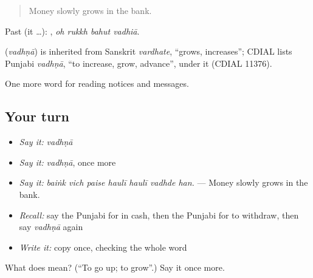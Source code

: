 \begin{quote}
Money slowly grows in the bank.
\end{quote}

Past (it …):    , \emph{oh rukkh bahut vadhiā}.

\begin{cousinweb}
\textbf{} (\emph{vadhṇā}) is inherited from Sanskrit \emph{vardhate}, \textquotedblleft{}grows, increases\textquotedblright{}; CDIAL lists Punjabi \emph{vadhṇā}, \textquotedblleft{}to increase, grow, advance\textquotedblright{}, under it (CDIAL 11376).
\end{cousinweb}

\begin{grammarlens}[title={What you've built}]
One more word for reading notices and messages.
\end{grammarlens}

\subsection*{Your turn}
\begin{itemize}
\raggedright
  \item \emph{Say it:} \emph{vadhṇā}
  \item \emph{Say it:} \emph{vadhṇā}, once more
  \item \emph{Say it:} \emph{baiṅk vich paise haulī haulī vadhde han.} — Money slowly grows in the bank.
  \item \emph{Recall:} say the Punjabi for in cash, then the Punjabi for to withdraw, then say \emph{vadhṇā} again
  \item \emph{Write it:} copy \textbf{} once, checking the whole word
\end{itemize}

\begin{tcolorbox}[breakable,colback=teal!4,colframe=teal!35!black,title={Before you move on}]
What does  mean? (\textquotedblleft{}To go up; to grow\textquotedblright{}.) Say it once more.
\end{tcolorbox}
